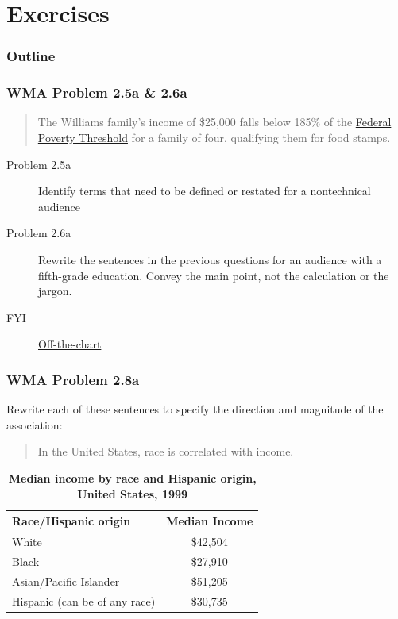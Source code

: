 \section{Exercises}

\begin{frame}[allowframebreaks]
    \frametitle{Outline}
\end{frame}

\begin{frame}
    \frametitle{WMA Problem 2.5a \& 2.6a}
        \begin{verse}
            The Williams family's income of \$25,000 falls below 185\% of the 
            \href{http://aspe.hhs.gov/poverty/12poverty.shtml}{Federal Poverty
            Threshold} for a family of four, qualifying them
            for food stamps. 
        \end{verse}
        \vskip0.3in
\begin{description}
    \item[Problem 2.5a] {Identify terms that need to be defined or restated
        for a nontechnical audience}
    \item[Problem 2.6a] Rewrite the sentences in the previous questions for an
        audience with a fifth-grade education.  Convey the main point,
        not the calculation or the jargon. 
    \item[FYI] \href{http://www.bloomberg.com/video/how-the-rich-get-richer-and-the-poor-poorer-kfuILNN9SoaQXLd5cVBwPQ.html}{Off-the-chart}
\end{description}
\end{frame}

\begin{frame}
    \frametitle{WMA Problem 2.8a}
    Rewrite each of these sentences to specify the direction and magnitude of
    the association:
    \vskip0.1in
    \begin{center}
    \begin{verse}
        In the United States, race is correlated with income. 
    \end{verse}
    \end{center}
    \begin{table}
        \centering
        \caption{\textbf{Median income by race and Hispanic origin, United States, 1999}}
        \label{tab:WMAex2x8}
        \begin{tabular}{lc}
        Race/Hispanic origin & Median Income \\
        \hline 
        White   & \$42,504 \\
        Black   & \$27,910 \\ 
        Asian/Pacific Islander   & \$51,205 \\ 
        Hispanic (can be of any race) & \$30,735 \\
        \hline
        \end{tabular}
    \end{table}
\end{frame}

